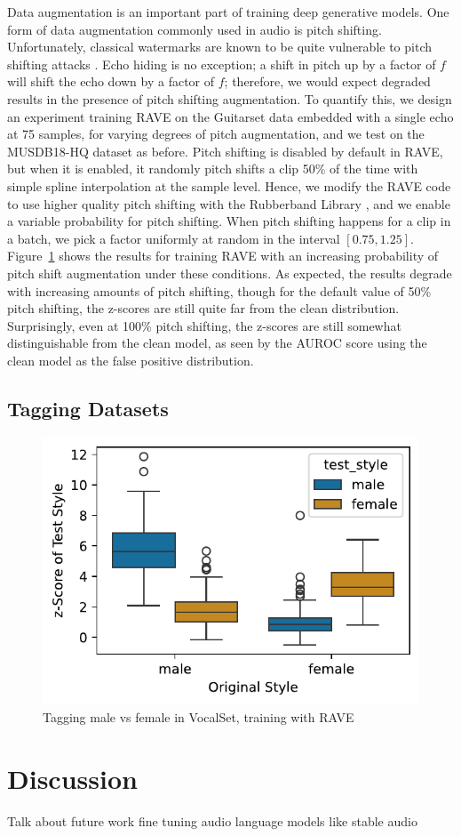 \documentclass[letterpaper]{article} %
\begin{document}
Data augmentation is an important part of training deep generative models.  One form of data augmentation commonly used in audio is pitch shifting.  Unfortunately, classical watermarks are known to be quite vulnerable to pitch shifting attacks \cite{hu2014variable}.  Echo hiding is no exception; a shift in pitch up by a factor of $f$ will shift the echo down by a factor of $f$; therefore, we would expect degraded results in the presence of pitch shifting augmentation.  To quantify this, we design an experiment training RAVE on the Guitarset data embedded with a single echo at 75 samples, for varying degrees of pitch augmentation, and we test on the MUSDB18-HQ dataset as before.  Pitch shifting is disabled by default in RAVE, but when it is enabled, it randomly pitch shifts a clip 50\% of the time with simple spline interpolation at the sample level.  Hence, we modify the RAVE code to use higher quality pitch shifting with the Rubberband Library \cite{cannam2024pyrubberband}, and we enable a variable probability for pitch shifting.  When pitch shifting happens for a clip in a batch, we pick a factor uniformly at random in the interval $[0.75, 1.25]$.  Figure~\ref{fig:pitchshiftaugmentation} shows the results for training RAVE with an increasing probability of pitch shift augmentation under these conditions.  As expected, the results degrade with increasing amounts of pitch shifting, though for the default value of 50\% pitch shifting, the z-scores are still quite far from the clean distribution.  Surprisingly, even at 100\% pitch shifting, the z-scores are still somewhat distinguishable from the clean model, as seen by the AUROC score using the clean model as the false positive distribution.

\subsection{Tagging Datasets}

\begin{figure}
    \centering
    \includegraphics[width=\columnwidth]{figs/Rave_Tagging_MaleFemale.pdf}
    \caption{Tagging male vs female in VocalSet, training with RAVE}
    \label{fig:pitchshiftaugmentation}
\end{figure}




\section{Discussion}
Talk about future work fine tuning audio language models like stable audio



\end{document}
